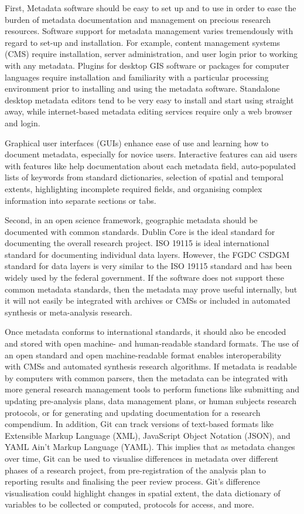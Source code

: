 \documentclass{isprs} %
\begin{document}
First, Metadata software should be easy to set up and to use in order to ease the burden of metadata documentation and management on precious research resources.
Software support for metadata management varies tremendously with regard to set-up and installation.
For example, content management systems (CMS) require installation, server administration, and user login prior to working with any metadata. 
Plugins for desktop GIS software or packages for computer languages require installation and familiarity with a particular  processing environment prior to installing and using the metadata software. 
Standalone desktop metadata editors tend to be very easy to install and start using straight away, while internet-based metadata editing services require only a web browser and login.

Graphical user interfaces (GUIs) enhance ease of use and learning how to document metadata, especially for novice users.
Interactive features can aid users with features like help documentation about each metadata field, auto-populated lists of keywords from standard dictionaries, selection of spatial and temporal extents, highlighting incomplete required fields, and organising complex information into separate sections or tabs.

Second, in an open science framework, geographic metadata should be documented with common standards. Dublin Core is the ideal standard for documenting the overall research project. ISO 19115 is ideal international standard for documenting individual data layers.
However, the FGDC CSDGM standard for data layers is very similar to the ISO 19115 standard and has been widely used by the federal government.
If the software does not support these common metadata standards, then the metadata may prove useful internally, but it will not easily be integrated with archives or CMSs or included in automated synthesis or meta-analysis research.

Once metadata conforms to international standards, it should also be encoded and stored with open machine- and human-readable standard formats. 
The use of an open standard and open machine-readable format enables interoperability with CMSs and automated synthesis research algorithms.
If metadata is readable by computers with common parsers, then the metadata can be integrated with more general research management tools to perform functions like submitting and updating pre-analysis plans, data management plans, or human subjects research protocols, or for generating and updating documentation for a research compendium.
In addition, Git can track versions of text-based formats like Extensible Markup Language (XML), JavaScript Object Notation (JSON), and YAML Ain't Markup Language (YAML).
This implies that as metadata changes over time, Git can be used to visualise differences in metadata over different phases of a research project, from pre-registration of the analysis plan to reporting results and finalising the peer review process.
Git's difference visualisation could highlight changes in spatial extent, the data dictionary of variables to be collected or computed, protocols for access, and more. 
\end{document}
